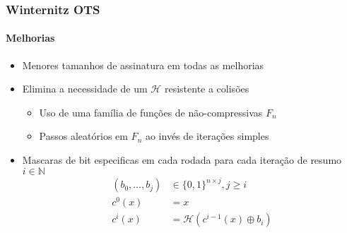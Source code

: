 \documentclass[12pt]{beamer}
\newcommand{\hh}{$\mathcal{H}$}
\begin{document}
\begin{frame}
  \frametitle{Winternitz OTS}
  \framesubtitle{Melhorias}
  \begin{itemize}
    \item Menores tamanhos de assinatura em todas as melhorias
    \item Elimina a necessidade de um \hh{} resistente a colisões
    \begin{itemize}
      \item Uso de uma família de funções de não-compressivas $F_n$
      \item Passos aleatórios em $F_n$ ao invés de iterações simples
    \end{itemize}
    \item Mascaras de bit especificas em cada rodada para cada iteração de resumo $i \in \mathbb{N}$ 
    \begin{align*}
      (b_0, \dots, b_j) &\in \{0,1\}^{n \times j}, j \geq i \\
      c^0(x) &= x \\
      c^i(x) &= \mathcal{H}(c^{i-1}(x) \oplus b_i)
    \end{align*}
  \end{itemize}
\end{frame}
\end{document}
